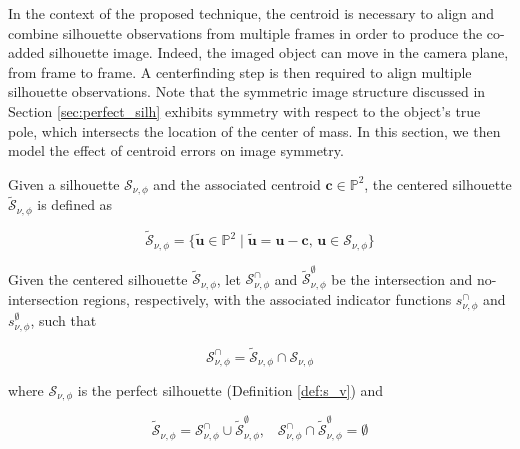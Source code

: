 In the context of the proposed technique, the centroid is necessary to align and combine silhouette observations from multiple frames in order to produce the co-added silhouette image. Indeed, the imaged object can move in the camera plane, from frame to frame. A centerfinding step is then required to align multiple silhouette observations. Note that the symmetric image structure discussed in Section \ref{sec:perfect_silh} exhibits symmetry with respect to the object's true pole, which intersects the location of the center of mass. In this section, we then model the effect of centroid errors on image symmetry.

\begin{definition}
    \label{def:s_tilde}
    Given a silhouette $\mathcal{S}_{\nu,\phi}$ and the associated centroid $\mathbf{c}\in\mathbb{P}^2$, the centered silhouette $\widetilde{\mathcal{S}}_{\nu,\phi}$ is defined as

    \begin{equation}
    \label{eq:S_centered}
        \widetilde{\mathcal{S}}_{\nu,\phi} = \{ \tilde{\mathbf{u}}\in\mathbb{P}^2\; | \; \tilde{\mathbf{u}} = \mathbf{u} - \mathbf{c},\, \mathbf{u} \in \mathcal{S}_{\nu,\phi}\}
    \end{equation}
\end{definition}

\begin{definition}
\label{def:s_tilde_int_and_err}
    Given the centered silhouette $\widetilde{\mathcal{S}}_{\nu,\phi}$, let $\mathcal{S}^{\cap}_{\nu,\phi}$ and $\tilde{\mathcal{S}}^\emptyset_{\nu,\phi}$ be the intersection and no-intersection regions, respectively, with the associated indicator functions $s^\cap_{\nu,\phi}$ and $s^\emptyset_{\nu,\phi}$, such that

        \begin{equation}
        \mathcal{S}^{\cap}_{\nu,\phi} = \widetilde{\mathcal{S}}_{\nu,\phi} \cap \mathcal{S}_{\nu,\phi}
    \end{equation}

    where $\mathcal{S}_{\nu,\phi}$ is the perfect silhouette (Definition \ref{def:s_v}) and

    \begin{equation}
    \label{eq:S_tilde}
        \widetilde{\mathcal{S}}_{\nu,\phi} = \mathcal{S}^{\cap}_{\nu,\phi} \cup \tilde{\mathcal{S}}^\emptyset_{\nu,\phi},\;\;\; \mathcal{S}^{\cap}_{\nu,\phi} \cap \tilde{\mathcal{S}}^\emptyset_{\nu,\phi} = \emptyset
    \end{equation}
\end{definition}

